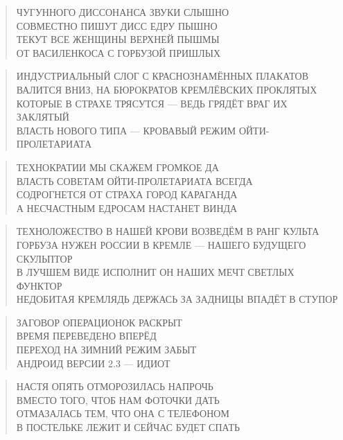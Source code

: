 \poemtitle{***}
\begin{verse}
ЧУГУННОГО ДИССОНАНСА ЗВУКИ СЛЫШНО\\
СОВМЕСТНО ПИШУТ ДИСС ЕДРУ ПЫШНО\\
ТЕКУТ ВСЕ ЖЕНЩИНЫ ВЕРХНЕЙ ПЫШМЫ\\
ОТ ВАСИЛЕНКОСА С ГОРБУЗОЙ ПРИШЛЫХ
\end{verse}

\poemtitle{***}
\begin{verse}
ИНДУСТРИАЛЬНЫЙ СЛОГ С КРАСНОЗНАМЁННЫХ ПЛАКАТОВ\\
ВАЛИТСЯ ВНИЗ, НА БЮРОКРАТОВ КРЕМЛЁВСКИХ ПРОКЛЯТЫХ\\
КОТОРЫЕ В СТРАХЕ ТРЯСУТСЯ — ВЕДЬ ГРЯДЁТ ВРАГ ИХ ЗАКЛЯТЫЙ\\
ВЛАСТЬ НОВОГО ТИПА — КРОВАВЫЙ РЕЖИМ ОЙТИ-ПРОЛЕТАРИАТА
\end{verse}

\poemtitle{***}
\begin{verse}
ТЕХНОКРАТИИ МЫ СКАЖЕМ ГРОМКОЕ ДА\\
ВЛАСТЬ СОВЕТАМ ОЙТИ-ПРОЛЕТАРИАТА ВСЕГДА\\
СОДРОГНЕТСЯ ОТ СТРАХА ГОРОД КАРАГАНДА\\
А НЕСЧАСТНЫМ ЕДРОСАМ НАСТАНЕТ ВИНДА
\end{verse}

\poemtitle{***}
\begin{verse}
ТЕХНОЛОЖЕСТВО В НАШЕЙ КРОВИ ВОЗВЕДЁМ В РАНГ КУЛЬТА\\
ГОРБУЗА НУЖЕН РОССИИ В КРЕМЛЕ — НАШЕГО БУДУЩЕГО СКУЛЬПТОР\\
В ЛУЧШЕМ ВИДЕ ИСПОЛНИТ ОН НАШИХ МЕЧТ СВЕТЛЫХ ФУНКТОР\\
НЕДОБИТАЯ КРЕМЛЯДЬ ДЕРЖАСЬ ЗА ЗАДНИЦЫ ВПАДЁТ В СТУПОР
\end{verse}

\poemtitle{***}
\begin{verse}
ЗАГОВОР ОПЕРАЦИОНОК РАСКРЫТ\\
ВРЕМЯ ПЕРЕВЕДЕНО ВПЕРЁД\\
ПЕРЕХОД НА ЗИМНИЙ РЕЖИМ ЗАБЫТ\\
АНДРОИД ВЕРСИИ 2.3 — ИДИОТ
\end{verse}

\poemtitle{***}
\begin{verse}
НАСТЯ ОПЯТЬ ОТМОРОЗИЛАСЬ НАПРОЧЬ\\
ВМЕСТО ТОГО, ЧТОБ НАМ ФОТОЧКИ ДАТЬ\\
ОТМАЗАЛАСЬ ТЕМ, ЧТО ОНА С ТЕЛЕФОНОМ\\
В ПОСТЕЛЬКЕ ЛЕЖИТ И СЕЙЧАС БУДЕТ СПАТЬ
\end{verse}

